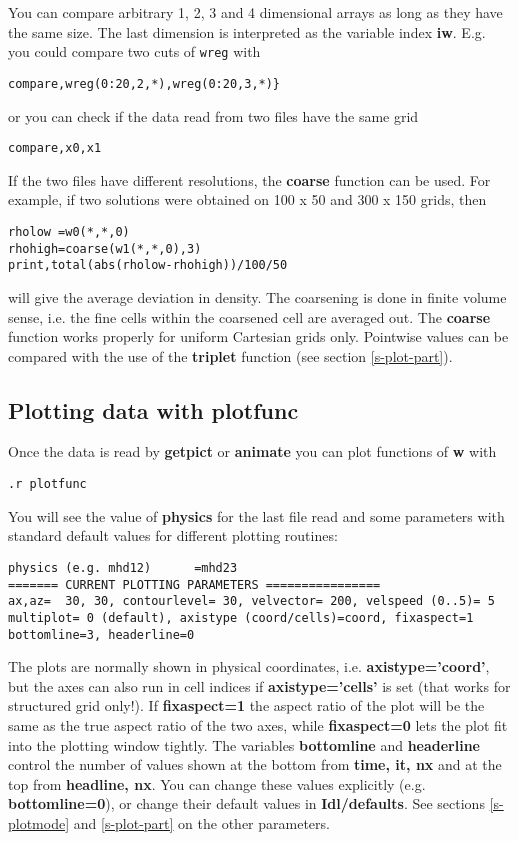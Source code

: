    You can compare arbitrary 1, 2, 3 and 4 dimensional arrays as long as they 
   have the same size.
   The last dimension is interpreted as the variable index {\bf iw}.
   E.g. you could compare two cuts of {\tt wreg} with
\begin{verbatim}
compare,wreg(0:20,2,*),wreg(0:20,3,*)}
\end{verbatim}
   or you can check if the data read from two files have the same grid
\begin{verbatim}
compare,x0,x1
\end{verbatim}
   If the two files have different resolutions, the {\bf coarse} 
   function can be used. For example, if two solutions were obtained on 
   100 x 50 and 300 x 150 grids, then 
\begin{verbatim}
rholow =w0(*,*,0)
rhohigh=coarse(w1(*,*,0),3)
print,total(abs(rholow-rhohigh))/100/50
\end{verbatim}
   will give the average deviation in density. The coarsening is done in
   finite volume sense, i.e. the fine cells within the coarsened cell are
   averaged out. The {\bf coarse} function works properly for
   uniform Cartesian grids only. Pointwise values can be compared
   with the use of the {\bf triplet} function (see section \ref{s-plot-part}).


\subsection{Plotting data with plotfunc \label{s-plotfunc}}

   Once the data is read by {\bf getpict} or {\bf animate} you can plot 
   functions of {\bf w} with
\begin{verbatim}
.r plotfunc
\end{verbatim}
   You will see the value of {\bf physics} for the last file read and some 
   parameters with standard default values for different plotting routines:
\begin{verbatim}
physics (e.g. mhd12)      =mhd23
======= CURRENT PLOTTING PARAMETERS ================
ax,az=  30, 30, contourlevel= 30, velvector= 200, velspeed (0..5)= 5
multiplot= 0 (default), axistype (coord/cells)=coord, fixaspect=1
bottomline=3, headerline=0
\end{verbatim}
   The plots are normally shown in physical coordinates, i.e.
   {\bf axistype='coord'}, but the axes can also run in cell indices 
   if {\bf axistype='cells'} is set (that works for structured grid only!).
   If {\bf fixaspect=1} the aspect ratio of the plot will be the same
   as the true aspect ratio of the two axes, while {\bf fixaspect=0} lets
   the plot fit into the plotting window tightly.
   The variables {\bf bottomline} and {\bf headerline} control the number
   of values shown at the bottom from {\bf time, it, nx} and at the top 
   from {\bf headline, nx}.
   You can change these values explicitly (e.g. {\bf bottomline=0}), or change 
   their default values in {\bf Idl/defaults}. 
   See sections \ref{s-plotmode} and \ref{s-plot-part} on the other parameters.

